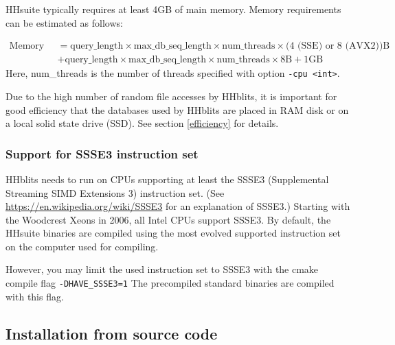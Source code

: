 \documentclass[11pt,a4paper]{article}
\begin{document}
HHsuite typically requires at least 4GB of main memory. Memory requirements can be estimated as follows:

\begin{equation}
\begin{split}
\textrm{Memory req.} & = \textrm{query\_length} \times \textrm{max\_db\_seq\_length} \times \textrm{num\_threads} \times \textrm{(4 (SSE) or 8 (AVX2))} \textrm{B} \\
 & + \textrm{query\_length} \times \textrm{max\_db\_seq\_length} \times \textrm{num\_threads} \times 8 \textrm{B} + 1 \textrm{GB} 
\end{split}
\end{equation}
Here, num\_threads is the number of threads specified with option \verb`-cpu <int>`.

Due to the high number of random file accesses by HHblits, it is important for good efficiency that the databases used by HHblits are placed in RAM disk or on a local solid state drive (SSD). See section \ref{efficiency} for details.


\subsubsection*{Support for SSSE3 instruction set} 

HHblits needs to run on CPUs supporting at least the SSSE3 (Supplemental Streaming SIMD Extensions 3) instruction set. (See \url{https://en.wikipedia.org/wiki/SSSE3} for an explanation of SSSE3.) Starting with the Woodcrest Xeons in 2006, all Intel CPUs support SSSE3. By default, the HHsuite binaries are compiled using the most evolved supported instruction set on the computer used for compiling.

However, you may limit the used instruction set to SSSE3 with the cmake compile flag \verb`-DHAVE_SSSE3=1`
The precompiled standard binaries are compiled with this flag. 

\subsection{Installation from source code} 

\newenvironment{enum}
 {\begin{list}{\arabic{mycounter}.~~}{\usecounter{mycounter} \labelsep=0em \labelwidth=0em \leftmargin=0em \itemindent=0em}}
 {\end{list}}
\end{document}
